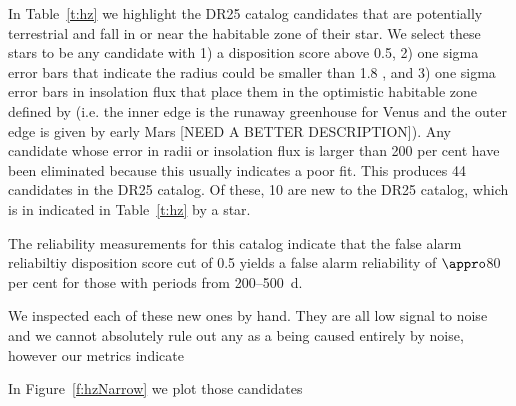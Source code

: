 In Table~\ref{t:hz} we highlight the DR25 catalog candidates that are potentially terrestrial and fall in or near the habitable zone of their star.  We select these stars to be any candidate with 1) a disposition score above 0.5, 2)  one sigma error bars that indicate the radius could be smaller than 1.8 \rearth, and 3) one sigma error bars in insolation flux that place them in the optimistic habitable zone defined by \citet{Kopparapu2013} (i.e. the inner edge is the runaway greenhouse for Venus and the outer edge is given by early Mars [NEED A BETTER DESCRIPTION]). Any candidate whose error in radii or insolation flux is larger than 200 per cent have been eliminated because this usually indicates a poor fit.  This produces 44 candidates in the DR25 catalog. Of these, 10 are new to the DR25 catalog, which is in indicated in Table~\ref{t:hz} by a star.

 

The reliability measurements for this catalog indicate that the false alarm reliabiltiy  disposition score cut of 0.5 yields a false alarm reliability of $\appro$80 per cent for those with periods from 200--500 \,d.  

We inspected each of these new ones by hand. They are all low signal to noise and we cannot absolutely rule out any as a being caused entirely by noise, however our metrics indicate

In Figure~\ref{f:hzNarrow} we plot those candidates